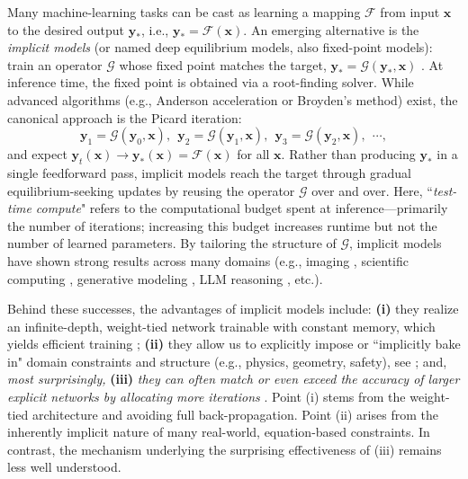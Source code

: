\documentclass{amsart} %
\def\vx{{\bm{x}}}
\def\vy{{\bm{y}}}
\def\cF{{\mathcal{F}}}
\def\cG{{\mathcal{G}}}
\theoremstyle{definition}
\theoremstyle{remark}
\begin{document}
Many machine-learning tasks can be cast as learning a mapping $\cF$ from input $\vx$ to the desired output $\vy_\ast$, i.e., $\vy_\ast = \cF(\vx)$. An emerging alternative is the \textit{implicit models} (or named deep equilibrium models, also fixed-point models): train an operator $\cG$ whose fixed point matches the target, $\vy_\ast = \cG(\vy_\ast, \vx)$ \cites{bai2019deep,el2021implicit}. At inference time, the fixed point is obtained via a root-finding solver. While advanced algorithms (e.g., Anderson acceleration or Broyden's method) exist, the canonical approach is the Picard iteration:
\begin{equation}
\label{eq:implicit-iterate}
\vy_1 = \cG(\vy_0, \vx), ~~ \vy_2 = \cG(\vy_1, \vx), ~~ \vy_3 = \cG(\vy_2, \vx), ~~ \cdots, 
\end{equation}
and expect $\vy_t(\vx) \to \vy_\ast(\vx)= \cF(\vx)$ for all $\vx$. Rather than producing $\vy_\ast$ in a single feedforward pass, implicit models reach the target through gradual equilibrium-seeking updates by reusing the operator $\cG$ over and over.
Here, ``\textit{test-time compute}" refers to the computational budget spent at inference—primarily the number of iterations; increasing this budget increases runtime but not the number of learned parameters.
By tailoring the structure of $\cG$, implicit models have shown strong results across many domains (e.g., imaging \cite{gilton2021deep}, scientific computing \cite{marwah2023deep}, generative modeling \cite{pokle2022deep,geng2023one}, LLM reasoning \cite{geiping2025scaling}, etc.).


Behind these successes, the advantages of implicit models include: \textbf{(i)} they realize an infinite-depth, weight-tied network trainable with constant memory, which yields efficient training \cite{fung2022jfb,geng2021training}; \textbf{(ii)} they allow us to explicitly impose or ``implicitly bake in" domain constraints and structure (e.g., physics, geometry, safety), see \cite{xie2022optimization,gungor2023deq,oshin2024differentiable}; and, \textit{most surprisingly,} \textbf{(iii)} \textit{they can often match or even exceed the accuracy of larger explicit networks by allocating more iterations} \cite{marwah2023deep,wang2024lion,geiping2025scaling,yang2024looped}. Point (i) stems from the weight-tied architecture and avoiding full back-propagation. Point (ii) arises from the inherently implicit nature of many real-world, equation-based constraints. In contrast, the mechanism underlying the surprising effectiveness of (iii) remains less well understood.
\end{document}
